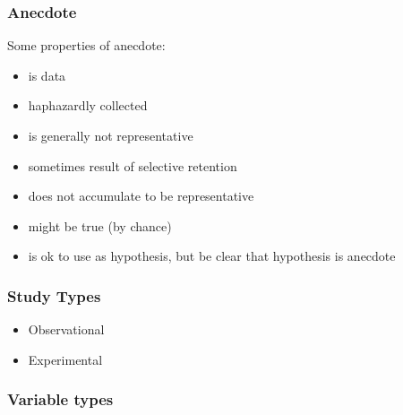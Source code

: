 \begin{frame}[t]
{    
  }

\end{frame}

\begin{frame}
  \frametitle{Anecdote}

  Some properties of anecdote:
  
  \begin{itemize}
  \item is data
  \item haphazardly collected
  \item is generally not representative
  \item sometimes result of selective retention
  \item does not accumulate to be representative
  \item might be true (by chance)
  \item is ok to use as hypothesis, but be clear that hypothesis is anecdote
  \end{itemize}
\end{frame}

\begin{frame}
  \frametitle{Study Types}

  \begin{itemize}
  \item Observational
  \item Experimental
  \end{itemize}
  
\end{frame}

\begin{frame}
  \frametitle{Variable types}
\end{frame}

\begin{frame}
\end{frame}

